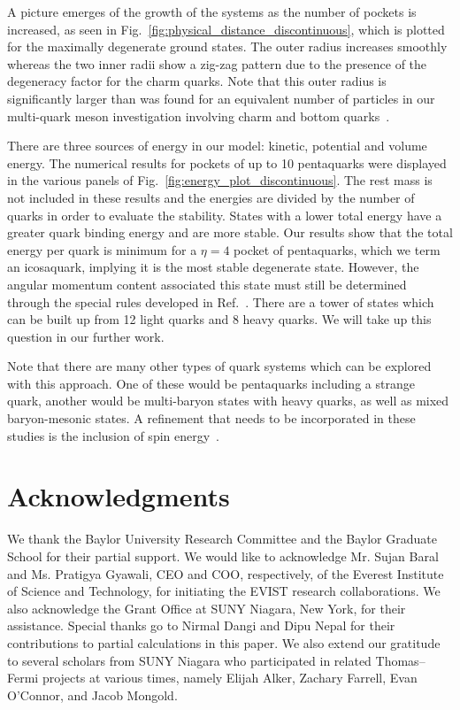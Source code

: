 \documentclass[final,3p,times,twocolumn]{elsarticle}
\begin{document}
A picture emerges of the growth of the systems as the number of pockets is increased, as seen in Fig.~\ref{fig:physical_distance_discontinuous}, which is plotted for the maximally degenerate ground states. The outer radius increases smoothly whereas the two inner radii show a zig-zag pattern due to the presence of the degeneracy factor for the charm quarks. Note that this outer radius is significantly larger than was found for an equivalent number of particles in our multi-quark meson investigation involving charm and bottom quarks~\cite{Baral:2019qpl}. 

There are three sources of energy in our model: kinetic, potential and volume energy. The numerical results for pockets of up to 10 pentaquarks were displayed in the various panels of Fig.~\ref{fig:energy_plot_discontinuous}. The rest mass is not included in these results and the energies are divided by the number of quarks in order to evaluate the stability. States with a lower total energy have a greater quark binding energy and are more stable. Our results show that the total energy per quark is minimum for a $\eta=4$ pocket of pentaquarks, which we term an icosaquark, implying it is the most stable degenerate state. However, the angular momentum content associated this state must still be determined through the special rules developed in Ref.~\cite{Liu:2012my}. There are a tower of states which can be built up from 12 light quarks and 8 heavy quarks. We will take up this question in our further work.

Note that there are many other types of quark systems which can be explored with this approach. One of these would be pentaquarks including a strange quark, another would be multi-baryon states with heavy quarks, as well as mixed baryon-mesonic states. A refinement that needs to be incorporated in these studies is the inclusion of spin energy~\cite{Liu:2012my}. 


\section{Acknowledgments}
We thank the Baylor University Research Committee and the Baylor Graduate School for their partial support.
We would like to acknowledge Mr. Sujan Baral and Ms. Pratigya Gyawali, CEO and COO, respectively, of the Everest Institute of Science and Technology, for initiating the EVIST research collaborations.
We also acknowledge the Grant Office at SUNY Niagara, New York, for their assistance.
Special thanks go to Nirmal Dangi and Dipu Nepal for their contributions to partial calculations in this paper.
We also extend our gratitude to several scholars from SUNY Niagara who participated in related Thomas–Fermi projects at various times, namely Elijah Alker, Zachary Farrell, Evan O’Connor, and Jacob Mongold.
\end{document}
